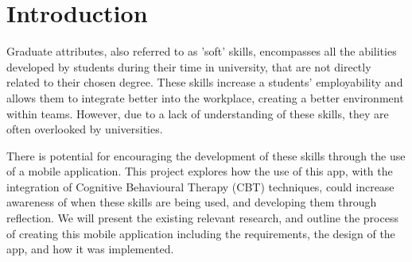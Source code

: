 \documentclass{l4proj}
\begin{document}
%
%
%
%
%
%
%
%
\chapter{Introduction}


Graduate attributes, also referred to as 'soft' skills, encompasses all the abilities developed by students during their time in university, that are not directly related to their chosen degree. These skills increase a students’ employability and allows them to integrate better into the workplace, creating a better environment within teams. However, due to a lack of understanding of these skills, they are often overlooked by universities.

There is potential for encouraging the development of these skills through the use of a mobile application. This project explores how the use of this app, with the integration of Cognitive Behavioural Therapy (CBT) techniques, could increase awareness of when these skills are being used, and developing them through reflection. We will present the existing relevant research, and outline the process of creating this mobile application including the requirements, the design of the app, and how it was implemented.
\end{document}
